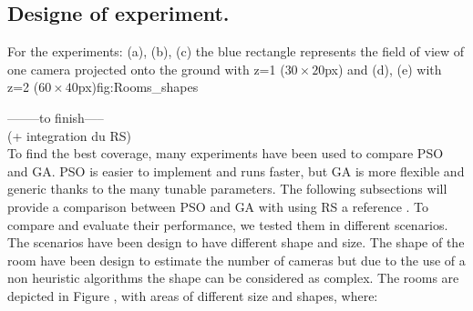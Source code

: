 
\subsection{Designe of experiment.}
\begin{mfigures}[!]{For the experiments: (a), (b), (c) the blue rectangle represents the field of view of one camera projected onto the ground  with z=1 ($30 \times 20 $px) and (d), (e) with z=2 ($60 \times 40 $px)}{fig:Rooms_shapes} \centering
{}
\hspace{1cm}
\hspace{1cm}
\end{mfigures}
--------to finish-----\\ (+ integration du RS)\\

To find the best coverage, many experiments have been used to compare PSO and GA. PSO is easier to implement and runs faster, but GA is more flexible and generic thanks to the many tunable parameters. 
The following subsections will provide a comparison between PSO and GA with using RS a reference .%
To compare and evaluate their performance, we tested them in different scenarios. The scenarios have been  design to have different shape and size. The shape of the room have been design to estimate the number of cameras but due to the use of a non heuristic algorithms the shape can be considered as complex. The rooms are depicted in Figure , with areas of different size and shapes, where: 





